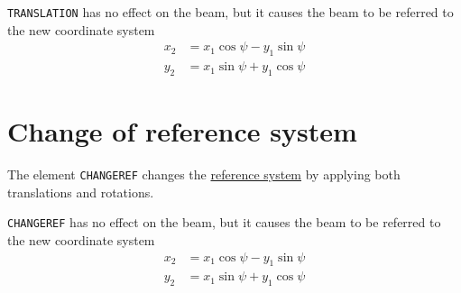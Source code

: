 
\texttt{TRANSLATION} has no effect on the beam, but it causes the beam to be 
referred to the new coordinate system \\ 
\begin{equation}\begin{split}
    x_2 &= x_1 \cos\psi - y_1 \sin\psi \\
    y_2 &= x_1 \sin\psi + y_1 \cos\psi
\end{split}\end{equation}


\section{Change of reference system}
\label{sec:changeref}

The element \texttt{CHANGEREF} changes the
\hyperref[subsec:local-straight]{reference system} 
by applying both translations and rotations.


\texttt{CHANGEREF} has no effect on the beam, but it causes the beam to
be referred to the new coordinate system \\ 
\begin{equation}\begin{split}
    x_2 &= x_1 \cos\psi - y_1 \sin\psi \\
    y_2 &= x_1 \sin\psi + y_1 \cos\psi
\end{split}\end{equation}

